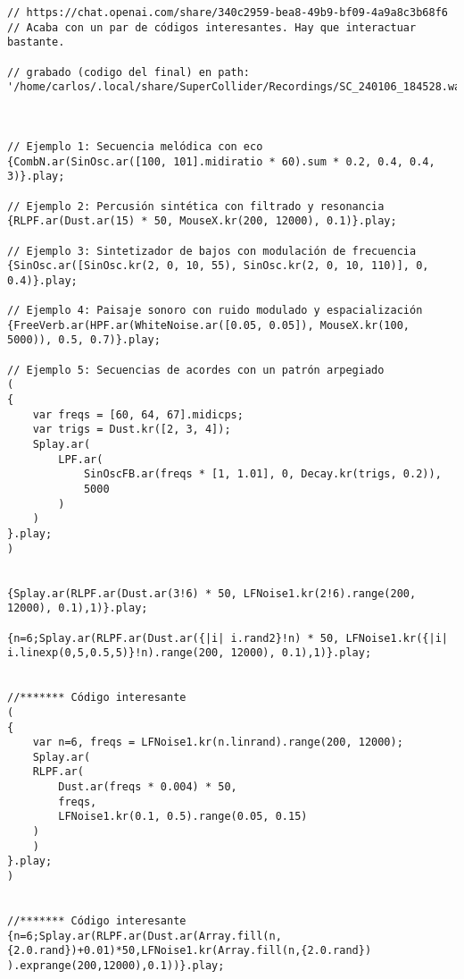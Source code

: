 \begin{minipage}[t]{1\textwidth}
    \centering
    \begin{lstlisting}[style=SuperCollider-IDE, basicstyle=\footnotesize\ttfamily, numbers=none]
// https://chat.openai.com/share/340c2959-bea8-49b9-bf09-4a9a8c3b68f6
// Acaba con un par de códigos interesantes. Hay que interactuar bastante.

// grabado (codigo del final) en path: '/home/carlos/.local/share/SuperCollider/Recordings/SC_240106_184528.wav'



// Ejemplo 1: Secuencia melódica con eco
{CombN.ar(SinOsc.ar([100, 101].midiratio * 60).sum * 0.2, 0.4, 0.4, 3)}.play;

// Ejemplo 2: Percusión sintética con filtrado y resonancia
{RLPF.ar(Dust.ar(15) * 50, MouseX.kr(200, 12000), 0.1)}.play;

// Ejemplo 3: Sintetizador de bajos con modulación de frecuencia
{SinOsc.ar([SinOsc.kr(2, 0, 10, 55), SinOsc.kr(2, 0, 10, 110)], 0, 0.4)}.play;

// Ejemplo 4: Paisaje sonoro con ruido modulado y espacialización
{FreeVerb.ar(HPF.ar(WhiteNoise.ar([0.05, 0.05]), MouseX.kr(100, 5000)), 0.5, 0.7)}.play;

// Ejemplo 5: Secuencias de acordes con un patrón arpegiado
(
{
    var freqs = [60, 64, 67].midicps;
    var trigs = Dust.kr([2, 3, 4]);
    Splay.ar(
        LPF.ar(
            SinOscFB.ar(freqs * [1, 1.01], 0, Decay.kr(trigs, 0.2)),
            5000
        )
    )
}.play;
)


{Splay.ar(RLPF.ar(Dust.ar(3!6) * 50, LFNoise1.kr(2!6).range(200, 12000), 0.1),1)}.play;

{n=6;Splay.ar(RLPF.ar(Dust.ar({|i| i.rand2}!n) * 50, LFNoise1.kr({|i| i.linexp(0,5,0.5,5)}!n).range(200, 12000), 0.1),1)}.play;


//******* Código interesante
(
{
    var n=6, freqs = LFNoise1.kr(n.linrand).range(200, 12000);
    Splay.ar(
    RLPF.ar(
        Dust.ar(freqs * 0.004) * 50,
        freqs,
        LFNoise1.kr(0.1, 0.5).range(0.05, 0.15)
    )
    )
}.play;
)


//******* Código interesante
{n=6;Splay.ar(RLPF.ar(Dust.ar(Array.fill(n,{2.0.rand})+0.01)*50,LFNoise1.kr(Array.fill(n,{2.0.rand})  ).exprange(200,12000),0.1))}.play;                                      
    \end{lstlisting}
    \vspace{1cm}
\end{minipage}